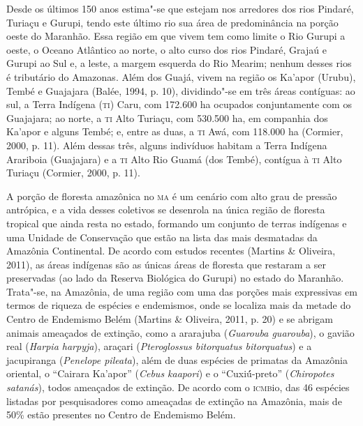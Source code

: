 Desde os últimos 150 anos estima"-se que estejam nos arredores dos rios
Pindaré, Turiaçu e Gurupi, tendo este último rio sua área de
predominância na porção oeste do Maranhão. Essa região em que vivem tem
como limite o Rio Gurupi a oeste, o Oceano Atlântico ao norte, o alto
curso dos rios Pindaré, Grajaú e Gurupi ao Sul e, a leste, a margem
esquerda do Rio Mearim; nenhum desses rios é tributário do Amazonas.
Além dos Guajá, vivem na região os Ka'apor (Urubu), Tembé e Guajajara
(Balée, 1994, p. 10), dividindo"-se em três áreas contíguas: ao sul, a
Terra Indígena (\textsc{ti}) Caru, com 172.600 ha ocupados conjuntamente com os
Guajajara; ao norte, a \textsc{ti} Alto Turiaçu, com 530.500 ha, em companhia dos
Ka'apor e alguns Tembé; e, entre as duas, a \textsc{ti} Awá, com 118.000 ha
(Cormier, 2000, p. 11). Além dessas três, alguns indivíduos habitam a
Terra Indígena Arariboia (Guajajara) e a \textsc{ti} Alto Rio Guamá (dos Tembé),
contígua à \textsc{ti} Alto Turiaçu (Cormier, 2000, p. 11).

A porção de floresta amazônica no \textsc{ma} é um cenário com alto grau de
pressão antrópica, e a vida desses coletivos se desenrola na única
região de floresta tropical que ainda resta no estado, formando um
conjunto de terras indígenas e uma Unidade de Conservação que estão na
lista das mais desmatadas da Amazônia Continental. De acordo com estudos
recentes (Martins \& Oliveira, 2011), as áreas indígenas são as únicas
áreas de floresta que restaram a ser preservadas (ao lado da Reserva
Biológica do Gurupi) no estado do Maranhão. Trata"-se, na Amazônia, de
uma região com uma das porções mais expressivas em termos de riqueza de
espécies e endemismos, onde se localiza mais da metade do Centro de
Endemismo Belém (Martins \& Oliveira, 2011, p. 20) e se abrigam animais
ameaçados de extinção, como a ararajuba (\emph{Guarouba guarouba}), o
gavião real (\emph{Harpia harpyja}), araçari (\emph{Pteroglossus
bitorquatus bitorquatus}) e a jacupiranga (\emph{Penelope pileata}),
além de duas espécies de primatas da Amazônia oriental, o ``Cairara
Ka'apor'' (\emph{Cebus kaapori}) e o ``Cuxiú́-preto'' (\emph{Chiropotes
satanás}), todos ameaçados de extinção. De acordo com o \textsc{icmb}io, das 46
espécies listadas por pesquisadores como ameaçadas de extinção na
Amazônia, mais de 50\% estão presentes no Centro de Endemismo Belém.

